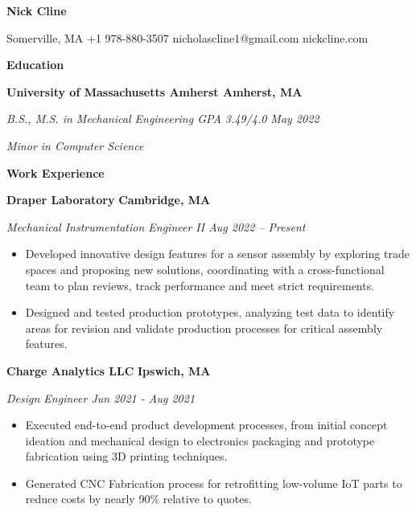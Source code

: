 \documentclass[11pt]{article}
\author{}
\date{}
\begin{document}
{\centering
\huge\textbf{Nick Cline}
\par}

\vspace{0.5em}  %

{\centering
\small
Somerville, MA \textbar{} +1 978-880-3507 \textbar{}
nicholascline1@gmail.com \textbar{} nickcline.com
\par}

\vspace{1em}  %

\textbf{Education}

\textbf{University of Massachusetts Amherst Amherst, MA}

\emph{B.S., M.S. in Mechanical Engineering \textbar{} GPA 3.49/4.0 May
2022}

\emph{Minor in Computer Science}

\textbf{Work Experience}

\textbf{Draper Laboratory} \textbf{Cambridge, MA}

\emph{Mechanical Instrumentation Engineer II Aug 2022 -- Present}

\begin{itemize}
\item
  Developed innovative design features for a sensor assembly by
  exploring trade spaces and proposing new solutions, coordinating with
  a cross-functional team to plan reviews, track performance and meet
  strict requirements.
\item
  Designed and tested production prototypes, analyzing test data to
  identify areas for revision and validate production processes for
  critical assembly features.
\end{itemize}

\textbf{Charge Analytics LLC} \textbf{Ipswich, MA}

\emph{Design Engineer Jun 2021 - Aug 2021}

\begin{itemize}
\item
  Executed end-to-end product development processes, from initial
  concept ideation and mechanical design to electronics packaging and
  prototype fabrication using 3D printing techniques.
\item
  Generated CNC Fabrication process for retrofitting low-volume IoT
  parts to reduce costs by nearly 90\% relative to quotes.
\end{itemize}
\end{document}
